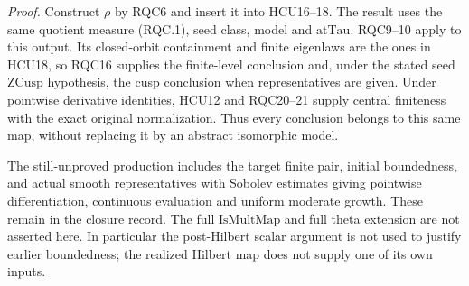 \emph{Proof.}
Construct \(\rho\) by RQC6 and insert it into HCU16--18.
The result uses the same quotient measure (RQC.1), seed class,
model and \(\mathrm{atTau}\).  RQC9--10 apply to this output.
Its closed-orbit containment and finite eigenlaws are the ones in
HCU18, so RQC16 supplies the finite-level conclusion and,
under the stated seed \(\mathrm{ZCusp}\) hypothesis, the cusp
conclusion when representatives are given.  Under pointwise derivative
identities, HCU12 and RQC20--21 supply central finiteness with
the exact original normalization.
Thus every conclusion belongs to this same map, without
replacing it by an abstract isomorphic model.

The still-unproved production includes the target finite pair,
initial boundedness, and actual smooth representatives with
Sobolev estimates giving pointwise differentiation, continuous
evaluation and uniform moderate growth.  These remain in the
closure record.  The full \(\mathrm{IsMultMap}\) and full theta
extension are not asserted here.  In particular the post-Hilbert
scalar argument is not used to justify earlier boundedness;
the realized Hilbert map does not supply one of its own inputs.

